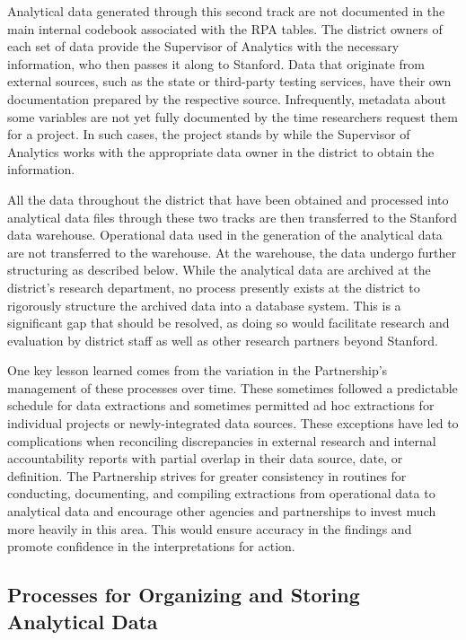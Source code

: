 Analytical data generated through this second track are not documented in the main internal codebook associated with the RPA tables. The district owners of each set of data provide the Supervisor of Analytics with the necessary information, who then passes it along to Stanford. Data that originate from external sources, such as the state or third-party testing services, have their own documentation prepared by the respective source. Infrequently, metadata about some variables are not yet fully documented by the time researchers request them for a project. In such cases, the project stands by while the Supervisor of Analytics works with the appropriate data owner in the district to obtain the information.

All the data throughout the district that have been obtained and processed into analytical data files through these two tracks are then transferred to the Stanford data warehouse. Operational data used in the generation of the analytical data are not transferred to the warehouse. At the warehouse, the data undergo further structuring as described below. While the analytical data are archived at the district's research department, no process presently exists at the district to rigorously structure the archived data into a database system. This is a significant gap that should be resolved, as doing so would facilitate research and evaluation by district staff as well as other research partners beyond Stanford.

One key lesson learned comes from the variation in the Partnership's management of these processes over time. These sometimes followed a predictable schedule for data extractions and sometimes permitted ad hoc extractions for individual projects or newly-integrated data sources. These exceptions have led to complications when reconciling discrepancies in external research and internal accountability reports with partial overlap in their data source, date, or definition. The Partnership strives for greater consistency in routines for conducting, documenting, and compiling extractions from operational data to analytical data and encourage other agencies and partnerships to invest much more heavily in this area. This would ensure accuracy in the findings and promote confidence in the interpretations for action.

\hypertarget{processes-for-organizing-and-storing-analytical-data}{%
\subsection{Processes for Organizing and Storing Analytical Data}\label{processes-for-organizing-and-storing-analytical-data}}

